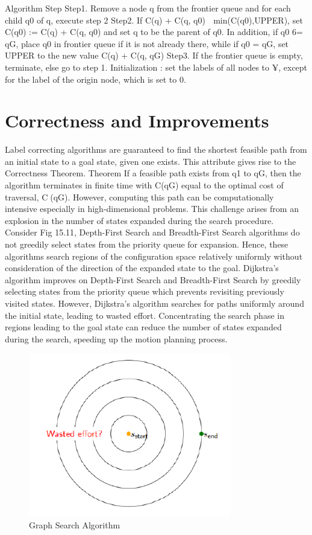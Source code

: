 \documentclass[twoside]{article}
\begin{document}
Algorithm Step
Step1. Remove a node q from the frontier queue and for each child q0 of q, execute step 2
Step2. If C(q) + C(q, q0)  min(C(q0),UPPER), set C(q0) := C(q) + C(q, q0) and set q to be the parent of q0. In addition, if q0 6= qG, place q0 in frontier queue if it is not already there, while if q0 = qG, set UPPER to the new value C(q) + C(q, qG)
Step3. If the frontier queue is empty, terminate, else go to step 1.
Initialization : set the labels of all nodes to ¥, except for the label of the origin node, which is set to 0.

\section{Correctness and Improvements}
Label correcting algorithms are guaranteed to find the shortest feasible path from an initial state to a goal state, given one exists. This attribute gives rise to the Correctness Theorem.
Theorem If a feasible path exists from q1 to qG, then the algorithm terminates in finite time with C(qG) equal to the optimal cost of traversal, C(qG).
However, computing this path can be computationally intensive especially in high-dimensional problems. This challenge arises from an explosion in the number of states expanded during the search procedure. Consider Fig 15.11, Depth-First Search and Breadth-First Search algorithms do not greedily select states from the priority queue for expansion. Hence, these algorithms search regions of the configuration space
relatively uniformly without consideration of the direction of the expanded state to the goal. Dijkstra’s algorithm improves on Depth-First Search and Breadth-First Search by greedily selecting states from the priority queue which prevents revisiting previously visited states. However, Dijkstra’s algorithm searches for paths uniformly around the initial state, leading to wasted effort. Concentrating the search phase in regions leading to the goal state can reduce the number of states expanded during the search, speeding up the motion planning process.

\begin{figure}[h]
\begin{center}
\includegraphics{fig15_11.PNG}
\caption{Graph Search Algorithm}
\end{center}
\end{figure}
\end{document}
